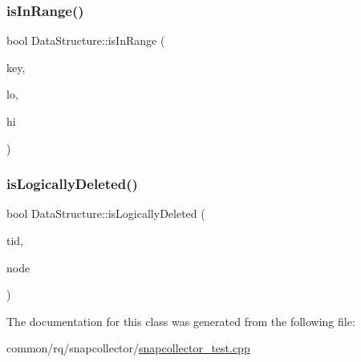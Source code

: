 \mbox{\label{classDataStructure_acfd7c8c402a2d2629359d0c446b23d10}} 
\subsubsection{\texorpdfstring{is\+In\+Range()}{isInRange()}}
{\footnotesize\ttfamily bool Data\+Structure\+::is\+In\+Range (\begin{DoxyParamCaption}\item[{const int \&}]{key,  }\item[{const int \&}]{lo,  }\item[{const int \&}]{hi }\end{DoxyParamCaption})\hspace{0.3cm}{\ttfamily [inline]}}

\mbox{\label{classDataStructure_a2337ec8648b072fe214cf5be64a9b17a}} 
\subsubsection{\texorpdfstring{is\+Logically\+Deleted()}{isLogicallyDeleted()}}
{\footnotesize\ttfamily bool Data\+Structure\+::is\+Logically\+Deleted (\begin{DoxyParamCaption}\item[{const int}]{tid,  }\item[{\hyperlink{classNode}{Node} $\ast$}]{node }\end{DoxyParamCaption})\hspace{0.3cm}{\ttfamily [inline]}}



The documentation for this class was generated from the following file\+:\begin{DoxyCompactItemize}
\item 
common/rq/snapcollector/\hyperlink{snapcollector__test_8cpp}{snapcollector\+\_\+test.\+cpp}\end{DoxyCompactItemize}
